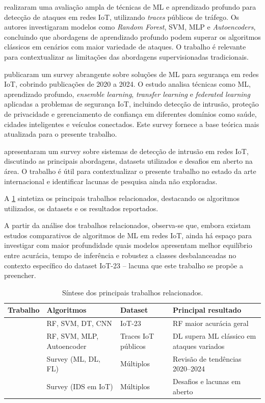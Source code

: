 \cite{Bochie2020} realizaram uma avaliação ampla de técnicas de ML e aprendizado profundo para detecção de ataques em redes IoT, utilizando \textit{traces} públicos de tráfego. Os autores investigaram modelos como \textit{Random Forest}, SVM, MLP e \textit{Autoencoders}, concluindo que abordagens de aprendizado profundo podem superar os algoritmos clássicos em cenários com maior variedade de ataques. O trabalho é relevante para contextualizar as limitações das abordagens supervisionadas tradicionais.

\cite{Alfahaid2025} publicaram um survey abrangente sobre soluções de ML para segurança em redes IoT, cobrindo publicações de 2020 a 2024. O estudo analisa técnicas como ML, aprendizado profundo, \textit{ensemble learning}, \textit{transfer learning} e \textit{federated learning} aplicadas a problemas de segurança IoT, incluindo detecção de intrusão, proteção de privacidade e gerenciamento de confiança em diferentes domínios como saúde, cidades inteligentes e veículos conectados. Este survey fornece a base teórica mais atualizada para o presente trabalho.

\cite{Rahman2025} apresentaram um survey sobre sistemas de detecção de intrusão em redes IoT, discutindo as principais abordagens, datasets utilizados e desafios em aberto na área. O trabalho é útil para contextualizar o presente trabalho no estado da arte internacional e identificar lacunas de pesquisa ainda não exploradas.

A \cref{tab:relacionados} sintetiza os principais trabalhos relacionados, destacando os algoritmos utilizados, os datasets e os resultados reportados.

A partir da análise dos trabalhos relacionados, observa-se que, embora existam estudos comparativos de algoritmos de ML em redes IoT, ainda há espaço para investigar com maior profundidade quais modelos apresentam melhor equilíbrio entre acurácia, tempo de inferência e robustez a classes desbalanceadas no contexto específico do dataset IoT-23 -- lacuna que este trabalho se propõe a preencher.

\begin{table}[ht]
\centering
\caption{Síntese dos principais trabalhos relacionados.}
\label{tab:relacionados}
\begin{tabular}{p{3.5cm}p{3.5cm}p{2.5cm}p{4cm}}
\hline
\textbf{Trabalho} & \textbf{Algoritmos} & \textbf{Dataset} & \textbf{Principal resultado} \\
\hline
\cite{SouzaArima2024} & RF, SVM, DT, CNN & IoT-23 & RF maior acurácia geral \\
\cite{Bochie2020} & RF, SVM, MLP, Autoencoder & Traces IoT públicos & DL supera ML clássico em ataques variados \\
\cite{Alfahaid2025} & Survey (ML, DL, FL) & Múltiplos & Revisão de tendências 2020--2024 \\
\cite{Rahman2025} & Survey (IDS em IoT) & Múltiplos & Desafios e lacunas em aberto \\
\hline
\end{tabular}
\end{table}